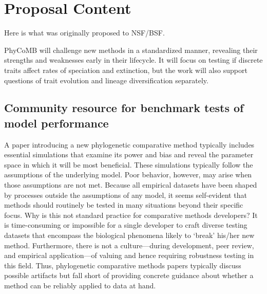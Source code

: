 \section{Proposal Content}

Here is what was originally proposed to NSF/BSF.

\bigskip

PhyCoMB will challenge new methods in a standardized manner, revealing their strengths and weaknesses early in their lifecycle.
It will focus on testing if discrete traits affect rates of speciation and extinction, but the work will also support questions of trait evolution and lineage diversification separately.

\subsection{Community resource for benchmark tests of model performance}

A paper introducing a new phylogenetic comparative method typically includes 
essential simulations that examine its power and bias and reveal the parameter space in which it will be most beneficial.
These simulations typically follow the assumptions of the underlying model.
Poor behavior, however, may arise when those assumptions are not met.
Because all empirical datasets have been shaped by processes outside the assumptions of any model, it seems self-evident that methods should routinely be tested in many situations beyond their specific focus.
Why is this not standard practice for comparative methods developers?
It is time-consuming or impossible for a single developer to craft diverse testing datasets that encompass the biological phenomena likely to `break' his/her new method.
Furthermore, there is not a culture---during development, peer review, and empirical application---of valuing and hence requiring robustness testing in this field.
Thus, phylogenetic comparative methods papers typically discuss possible artifacts but fall short of providing concrete guidance about whether a method can be reliably applied to data at hand. 

